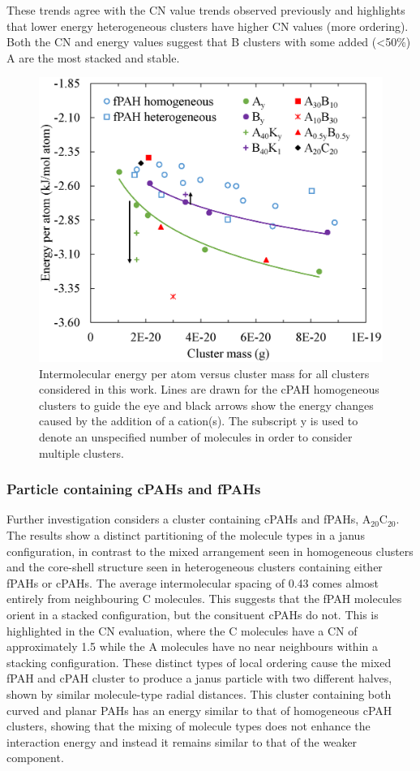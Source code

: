 These trends agree with the CN value trends observed previously and highlights that lower energy heterogeneous clusters have higher CN values (more ordering). %
Both the CN and energy values suggest that B clusters with some added (<50\%) A are the most stacked and stable.

%
\begin{figure}[!tbh]
\centering
\includegraphics[width=0.5\linewidth]{Figures/energies.eps}
\caption{Intermolecular energy per atom versus cluster mass for all clusters considered in this work. Lines are drawn for the cPAH homogeneous clusters to guide the eye and black arrows show the energy changes caused by the addition of a cation(s). The subscript y is used to denote an unspecified number of molecules in order to consider multiple clusters.}
\label{fig:energies}
\end{figure}
%

\subsubsection{Particle containing cPAHs and fPAHs}
Further investigation considers a cluster containing cPAHs and fPAHs, $\text{A}_{\text{20}}\text{C}_{\text{20}}$. The results show a distinct partitioning of the molecule types in a janus configuration, in contrast to the mixed arrangement seen in homogeneous clusters and the core-shell structure seen in heterogeneous clusters containing either fPAHs or cPAHs. The average intermolecular spacing of 0.43 comes almost entirely from neighbouring C molecules. This suggests that the fPAH molecules orient in a stacked configuration, but the consituent cPAHs do not. This is highlighted in the CN evaluation, where the C molecules have a CN of approximately 1.5 while the A molecules have no near neighbours within a stacking configuration. These distinct types of local ordering cause the mixed fPAH and cPAH cluster to produce a janus particle with two different halves, shown by similar molecule-type radial distances. This cluster containing both curved and planar PAHs has an energy similar to that of homogeneous cPAH clusters, showing that the mixing of molecule types does not enhance the interaction energy and instead it remains similar to that of the weaker component.

